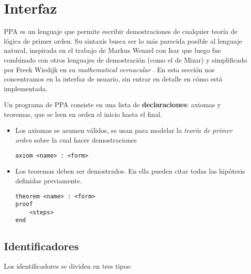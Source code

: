\section{Interfaz}

PPA es un lenguaje que permite escribir demostraciones de cualquier teoría de
lógica de primer orden. Su sintaxis busca ser lo más parecida posible al lenguaje natural, inspirada en el trabajo de Markus Wenzel con Isar \cite{wenzel-isar} que luego fue combinado con otros lenguajes de demostración (como el de Mizar) y simplificado por Freek Wiedijk en su \textit{mathematical vernacular} \cite{freek-mv}. En esta sección nos
concentramos en la interfaz de usuario, sin entrar en detalle en cómo está
implementada.

Un programa de PPA consiste en una lista de \textbf{declaraciones}: axiomas y
teoremas, que se leen en orden el inicio hasta el final.

\begin{itemize}
    \item Los axiomas se asumen válidos, se usan para modelar la \textit{teoría
    de primer orden} sobre la cual hacer demostraciones

    \begin{lstlisting}[numbers=none]
axiom <name> : <form>
    \end{lstlisting}

    \item Los teoremas deben ser demostrados. En ella pueden citar
    todas las hipótesis definidas previamente.

    \begin{lstlisting}[numbers=none]
theorem <name> : <form>
proof
    <steps>
end
    \end{lstlisting}
\end{itemize}

\subsection{Identificadores}

Los identificadores se dividen en tres tipos:

